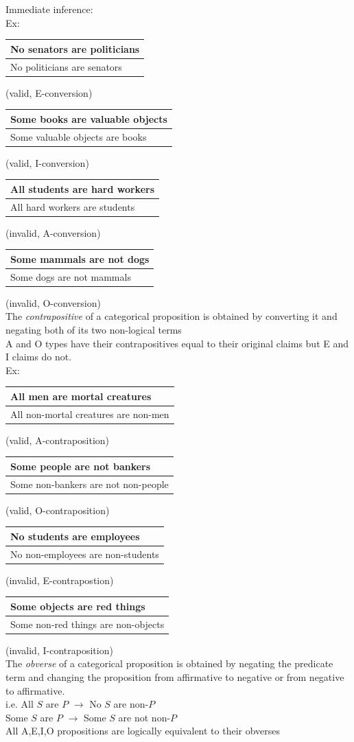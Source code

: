 \documentclass[11pt, fleqn]{article}
\newcommand{\argument}[2]{\begin{tabular}{p{#1 cm}} #2 \end{tabular}}
\begin{document}
Immediate inference:\\
Ex:\\
\argument{6}{No senators are politicians\\
\hline
No politicians are senators} (valid, E-conversion)\\
\argument{6}{Some books are valuable objects\\
\hline Some valuable objects are books} (valid, I-conversion)\\
\argument{6}{All students are hard workers\\
\hline
All hard workers are students} (invalid, A-conversion)\\
\argument{6}{Some mammals are not dogs\\
\hline
Some dogs are not mammals} (invalid, O-conversion)\\

The \textit{contrapositive} of a categorical proposition is obtained by converting it and negating both of its two non-logical terms\\
A and O types have their contrapositives equal to their original claims but E and I claims do not.\\

Ex:\\
\argument{7}{All men are mortal creatures\\
\hline All non-mortal creatures are non-men} (valid, A-contraposition)\\
\argument{7}{Some people are not bankers\\
\hline Some non-bankers are not non-people} (valid, O-contraposition)\\
\argument{7}{No students are employees\\
\hline No non-employees are non-students} (invalid, E-contrapostion)\\
\argument{7}{Some objects are red things\\
\hline Some non-red things are non-objects} (invalid, I-contraposition)\\

The \textit{obverse} of a categorical proposition is obtained by negating the predicate term and changing the proposition from affirmative to negative or from negative to affirmative.\\
i.e. All $S$ are $P$ $\to$ No $S$ are non-$P$\\
Some $S$ are $P$ $\to$ Some $S$ are not non-$P$\\
All A,E,I,O propositions are logically equivalent to their obverses\\
\end{document}
